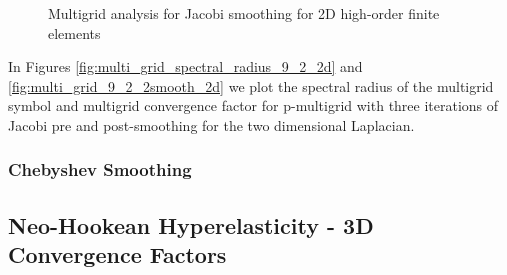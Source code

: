 \documentclass[review]{siamart190516}
\begin{document}
\begin{figure}[!tbp]
  \centering
  \caption{Multigrid analysis for Jacobi smoothing for 2D high-order finite elements}
\end{figure}

In Figures \ref{fig:multi_grid_spectral_radius_9_2_2d} and \ref{fig:multi_grid_9_2_2smooth_2d} we plot the spectral radius of the multigrid symbol and multigrid convergence factor for p-multigrid with three iterations of Jacobi pre and post-smoothing for the two dimensional Laplacian.

\subsubsection{Chebyshev Smoothing}

\subsection{Neo-Hookean Hyperelasticity - 3D Convergence Factors}\label{sec:3dresults}
\end{document}
